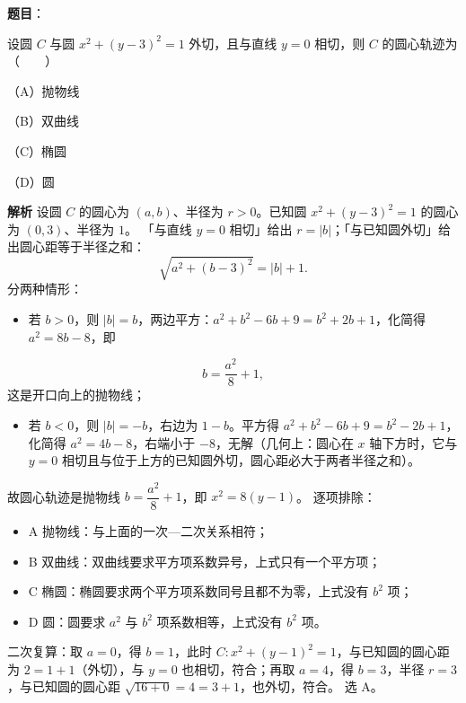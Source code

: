 \begin{answer}

\textbf{题目}：

设圆 $C$ 与圆 $x^2+(y-3)^2=1$ 外切，且与直线 $y=0$ 相切，则 $C$ 的圆心轨迹为\mbox{（　　）}

（A）抛物线

（B）双曲线

（C）椭圆

（D）圆

\textbf{解析}
设圆 $C$ 的圆心为 $(a,b)$、半径为 $r>0$。已知圆 $x^2+(y-3)^2=1$ 的圆心为 $(0,3)$、半径为 $1$。
「与直线 $y=0$ 相切」给出 $r=|b|$；「与已知圆外切」给出圆心距等于半径之和：
\nopagebreak[4]
\[
\sqrt{a^2+(b-3)^2}=|b|+1.
\]
分两种情形：
\begin{itemize}
\item 若 $b>0$，则 $|b|=b$，两边平方：$a^2+b^2-6b+9=b^2+2b+1$，化简得 $a^2=8b-8$，即
\end{itemize}
\nopagebreak[4]
\[
b=\frac{a^2}{8}+1,
\]
这是开口向上的抛物线；
\begin{itemize}
\item 若 $b<0$，则 $|b|=-b$，右边为 $1-b$。平方得 $a^2+b^2-6b+9=b^2-2b+1$，化简得 $a^2=4b-8$，右端小于 $-8$，无解（几何上：圆心在 $x$ 轴下方时，它与 $y=0$ 相切且与位于上方的已知圆外切，圆心距必大于两者半径之和）。
\end{itemize}

故圆心轨迹是抛物线 $b=\dfrac{a^2}{8}+1$，即 $x^2=8(y-1)$。
逐项排除：
\begin{itemize}
\item A 抛物线：与上面的一次—二次关系相符；
\item B 双曲线：双曲线要求平方项系数异号，上式只有一个平方项；
\item C 椭圆：椭圆要求两个平方项系数同号且都不为零，上式没有 $b^2$ 项；
\item D 圆：圆要求 $a^2$ 与 $b^2$ 项系数相等，上式没有 $b^2$ 项。
\end{itemize}
二次复算：取 $a=0$，得 $b=1$，此时 $C:x^2+(y-1)^2=1$，与已知圆的圆心距为 $2=1+1$（外切），与 $y=0$ 也相切，符合；再取 $a=4$，得 $b=3$，半径 $r=3$，与已知圆的圆心距 $\sqrt{16+0}=4=3+1$，也外切，符合。
选 A。


\end{answer}
